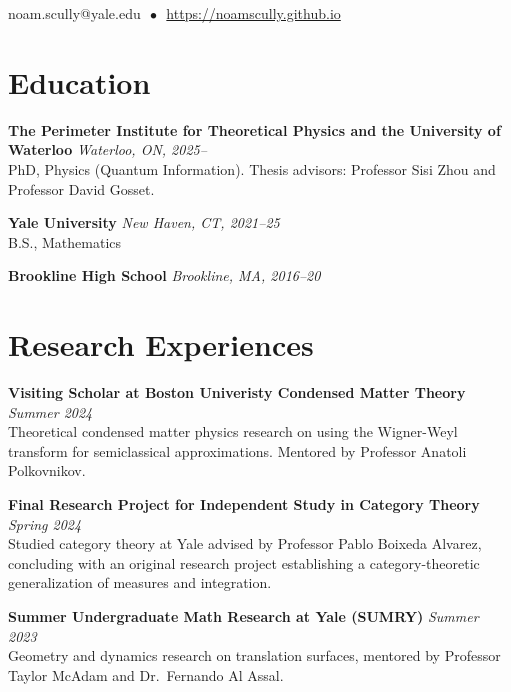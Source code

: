 \documentclass[11pt]{article}
\newcommand{\entry}[3]{
    \vspace{-.58em}
    \textbf{#1} \hfill \textit{#2} \\
    #3 \vspace{0.5em}}
\begin{document}
\begin{center}

  
  \vspace{-.1em}
  \hspace{1.8em}
  noam.scully@yale.edu $\, \bullet \,$ \href{https://noamscully.github.io}{https://noamscully.github.io}

\end{center}
\vspace{-0.3em}

\section*{Education}
\vspace{.58em}
\vspace{-0.1em}

\entry{The Perimeter Institute for Theoretical Physics and the University of Waterloo}{Waterloo, ON, 2025--}{
PhD, Physics (Quantum Information). Thesis advisors: Professor Sisi Zhou and Professor David Gosset.
}

\entry{Yale University}{New Haven, CT, 2021--25}{
B.S., Mathematics
}

\entry{Brookline High School}{Brookline, MA, 2016--20}{
\vspace{-\baselineskip}
}


\section*{Research Experiences}
\vspace{.58em}
\vspace{-0.1em}

\entry{Visiting Scholar at Boston Univeristy Condensed Matter Theory}{Summer 2024}{
Theoretical condensed matter physics research on using the Wigner-Weyl transform for semiclassical approximations. Mentored by Professor Anatoli Polkovnikov.
}

\entry{Final Research Project for Independent Study in Category Theory}{Spring 2024}{
Studied category theory at Yale advised by Professor Pablo Boixeda Alvarez, concluding with an original research project establishing a category-theoretic generalization of measures and integration. 
}

\entry{Summer Undergraduate Math Research at Yale (SUMRY)}{Summer 2023}{
Geometry and dynamics research on translation surfaces, mentored by Professor Taylor McAdam and Dr.\ Fernando Al Assal. %
}
\end{document}
